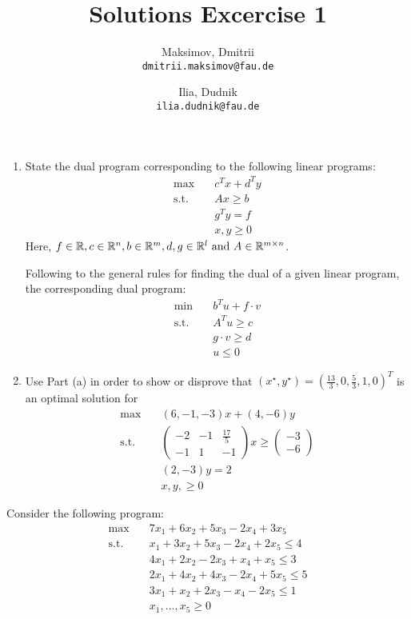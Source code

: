 \documentclass{homework}
\title{Solutions Excercise 1}
\author{
  Maksimov, Dmitrii\\
  \texttt{dmitrii.maksimov@fau.de}
  \and
  Ilia, Dudnik\\
  \texttt{ilia.dudnik@fau.de}
}
\begin{document}
\maketitle

\exercise
\begin{enumerate}[label=(\alph*)]
	\item State the dual program corresponding to the following linear programs:
	\begin{align*}
		\text{max} \quad
		&c^T x + d^T y \\
		\text{s.t.} \quad
		&Ax \geq b \\
		&g^T y = f \\
		&x, y \geq 0
	\end{align*}
	Here, $f \in \mathbb R, c \in \mathbb R^n, b \in \mathbb R^m, d,g \in \mathbb R^l \text{ and } A \in \mathbb R^{m \times n}$.

	Following to the general rules for finding the dual of a given linear program, the corresponding dual program:
		\begin{align*}
			\text{min} \quad
			&b^T u + f\cdot v \\
			\text{s.t.} \quad
			&A^T u \geq c \\
			&g\cdot v \geq d \\
			&u \leq 0
		\end{align*}
	\item Use Part (a) in order to show or disprove that $(x^\star, y^\star) = (\frac{13}{3}, 0, \frac{5}{3}, 1, 0)^T$ is an optimal solution for
		\begin{align*}
			\text{max} \quad
			&(6, -1, -3) x + (4, -6)y \\
			\text{s.t.} \quad
			&\begin{pmatrix}
			-2 & -1 & \frac{17}{5} \\
			-1 & 1 &-1
			\end{pmatrix}x \geq  \begin{pmatrix}
							-3 \\
							-6
							\end{pmatrix}\\
			&(2, -3)y = 2 \\
			&x,y, \geq 0
		\end{align*}

\end{enumerate}
\exercise
Consider the following program:
\begin{align*}
	\text{max} \quad
	&7x_1 + 6x_2 + 5x_3 - 2x_4 + 3x_5\\
	\text{s.t.} \quad
	&x_1 + 3x_2 + 5x_3 - 2x_4 + 2x_5\leq 4 \\
	&4x_1 + 2x_2 - 2x_3 + x_4 + x_5\leq 3 \\
	&2x_1 + 4x_2 + 4x_3 - 2x_4 + 5x_5\leq 5 \\
	&3x_1 + x_2 + 2x_3 - x_4 - 2x_5\leq 1 \\
	&x_1, \dots, x_5 \geq 0
\end{align*}
\end{document}
